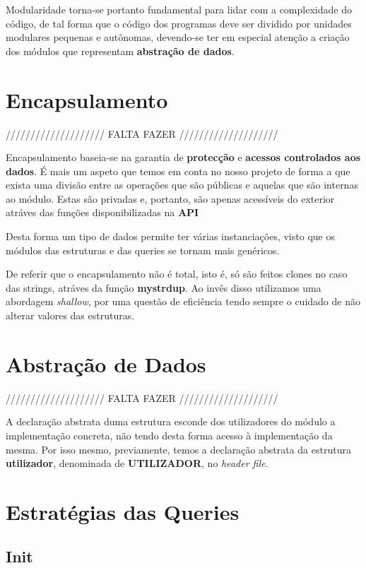 \documentclass[a4paper]{article}
\begin{document}
Modularidade torna-se portanto fundamental para lidar com a complexidade
do código, de tal forma que o código dos programas deve ser dividido por
unidades modulares pequenas e autônomas, devendo-se ter em especial atenção
a criação dos módulos que representam \textbf{abstração de dados}.

\section{Encapsulamento}
\label{sec:encapsulamento}

//////////////////// FALTA FAZER ////////////////////

Encapsulamento baseia-se na garantia de \textbf{protecção} e 
\textbf{acessos controlados aos dados}. É mais um aspeto que temos em 
conta no nosso projeto de forma a que exista uma divisão entre as operações 
que são públicas e aquelas que são internas ao módulo. Estas são privadas e,
portanto, são apenas acessíveis do exterior atráves das funções
disponibilizadas na \textbf{API}

Desta forma um tipo de dados permite ter várias instanciações,
visto que os módulos das estruturas e das queries se tornam mais genéricos.

De referir que o encapsulamento não é total, isto é, só são feitos clones
no caso das strings, atráves da função \textbf{mystrdup}. 
Ao invês disso utilizamos uma abordagem \textit{shallow}, por uma questão de 
eficiência tendo sempre o cuidado de não alterar valores das estruturas.

\section{Abstração de Dados}
\label{sec:abstracao_de_dados}

//////////////////// FALTA FAZER ////////////////////

A declaração abstrata duma estrutura esconde dos utilizadores do módulo a
implementação concreta, não tendo desta forma acesso à implementação
da mesma. Por isso mesmo, previamente, temos a declaração abstrata da 
estrutura \textbf{utilizador}, denominada de \textbf{UTILIZADOR}, no
\textit{header file}.

\section{Estratégias das Queries}
\label{sec:estrategias}

\subsection{Init}
\end{document}
